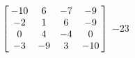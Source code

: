 {$\left[\hskip -3pt \begin{array}{cccc} -10&6&-7&-9\\  -2&1&6&-9
\\  0&4&-4&0\\  -3&-9&3&-10
\end{array}\hskip -3pt \right] $} 
{$-23$}



  

